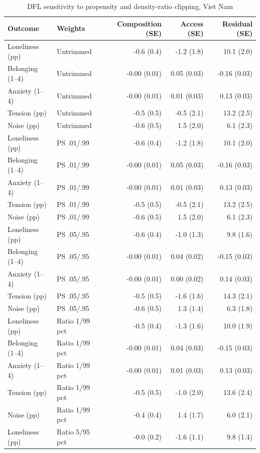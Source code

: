 \begin{table}[H]\centering\scriptsize
\caption{DFL sensitivity to propensity and density-ratio clipping, Viet Nam}\label{tab:dflsens}
\begin{tabular}{@{}llrrr@{}}
\toprule
Outcome & Weights & Composition (SE) & Access (SE) & Residual (SE)\\
\midrule
Loneliness (pp) & Untrimmed & -0.6 (0.4) & -1.2 (1.8) & 10.1 (2.0)\\
Belonging (1--4) & Untrimmed & -0.00 (0.01) & 0.05 (0.03) & -0.16 (0.03)\\
Anxiety (1--4) & Untrimmed & -0.00 (0.01) & 0.01 (0.03) & 0.13 (0.03)\\
Tension (pp) & Untrimmed & -0.5 (0.5) & -0.5 (2.1) & 13.2 (2.5)\\
Noise (pp) & Untrimmed & -0.6 (0.5) & 1.5 (2.0) & 6.1 (2.3)\\
Loneliness (pp) & PS .01/.99 & -0.6 (0.4) & -1.2 (1.8) & 10.1 (2.0)\\
Belonging (1--4) & PS .01/.99 & -0.00 (0.01) & 0.05 (0.03) & -0.16 (0.03)\\
Anxiety (1--4) & PS .01/.99 & -0.00 (0.01) & 0.01 (0.03) & 0.13 (0.03)\\
Tension (pp) & PS .01/.99 & -0.5 (0.5) & -0.5 (2.1) & 13.2 (2.5)\\
Noise (pp) & PS .01/.99 & -0.6 (0.5) & 1.5 (2.0) & 6.1 (2.3)\\
Loneliness (pp) & PS .05/.95 & -0.6 (0.4) & -1.0 (1.3) & 9.8 (1.6)\\
Belonging (1--4) & PS .05/.95 & -0.00 (0.01) & 0.04 (0.02) & -0.15 (0.03)\\
Anxiety (1--4) & PS .05/.95 & -0.00 (0.01) & 0.00 (0.02) & 0.14 (0.03)\\
Tension (pp) & PS .05/.95 & -0.5 (0.5) & -1.6 (1.6) & 14.3 (2.1)\\
Noise (pp) & PS .05/.95 & -0.6 (0.5) & 1.3 (1.4) & 6.3 (1.8)\\
Loneliness (pp) & Ratio 1/99 pct & -0.5 (0.4) & -1.3 (1.6) & 10.0 (1.9)\\
Belonging (1--4) & Ratio 1/99 pct & -0.00 (0.01) & 0.04 (0.03) & -0.15 (0.03)\\
Anxiety (1--4) & Ratio 1/99 pct & -0.00 (0.01) & 0.01 (0.03) & 0.13 (0.03)\\
Tension (pp) & Ratio 1/99 pct & -0.5 (0.5) & -1.0 (2.0) & 13.6 (2.4)\\
Noise (pp) & Ratio 1/99 pct & -0.4 (0.4) & 1.4 (1.7) & 6.0 (2.1)\\
Loneliness (pp) & Ratio 5/95 pct & -0.0 (0.2) & -1.6 (1.1) & 9.8 (1.4)\\

\end{tabular}
\end{table}
